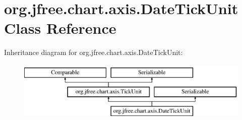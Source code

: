 \hypertarget{classorg_1_1jfree_1_1chart_1_1axis_1_1_date_tick_unit}{}\section{org.\+jfree.\+chart.\+axis.\+Date\+Tick\+Unit Class Reference}
\label{classorg_1_1jfree_1_1chart_1_1axis_1_1_date_tick_unit}
Inheritance diagram for org.\+jfree.\+chart.\+axis.\+Date\+Tick\+Unit\+:\begin{figure}[H]
\begin{center}
\leavevmode
\includegraphics[height=2.772277cm]{classorg_1_1jfree_1_1chart_1_1axis_1_1_date_tick_unit}
\end{center}
\end{figure}
